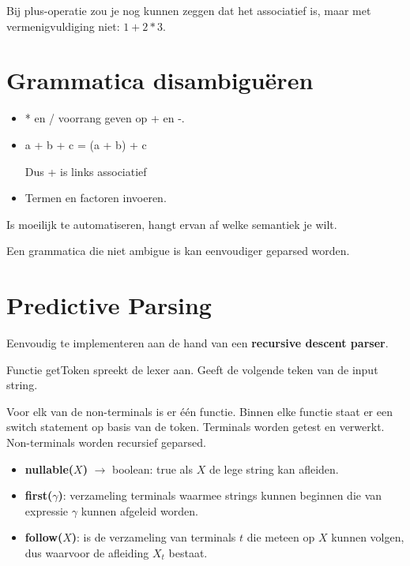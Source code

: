 
Bij plus-operatie zou je nog kunnen zeggen dat het associatief is, maar met vermenigvuldiging niet: $1 + 2 * 3$.

\section{Grammatica disambiguëren}
\begin{itemize}
	\item * en / voorrang geven op + en -.
	\item a + b + c = (a + b) + c
	
	Dus + is links associatief
	\item Termen en factoren invoeren.
\end{itemize}
Is moeilijk te automatiseren, hangt ervan af welke semantiek je wilt.

Een grammatica die niet ambigue is kan eenvoudiger geparsed worden.

\section{Predictive Parsing}
Eenvoudig te implementeren aan de hand van een \textbf{recursive descent parser}.

Functie getToken spreekt de lexer aan. Geeft de volgende teken van de input string.

Voor elk van de non-terminals is er één functie. Binnen elke functie staat er een switch statement op  basis van de token. Terminals worden getest en verwerkt. Non-terminals worden recursief geparsed.



\begin{itemize}
	\item \textbf{nullable($X$)} $\rightarrow$ boolean: true als $X$ de lege string kan afleiden.
	\item \textbf{first($\gamma$)}: verzameling terminals waarmee strings kunnen beginnen die van expressie $\gamma$ kunnen afgeleid worden.
	\item \textbf{follow($X$)}: is de verzameling van terminals $t$ die meteen op $X$ kunnen volgen, dus waarvoor de afleiding $X_t$ bestaat. 
\end{itemize}

